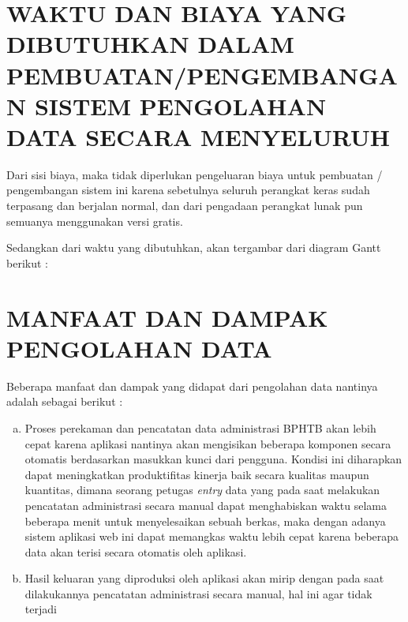 \documentclass[pdftex,12pt, oneside]{article}
\begin{document}
\section{WAKTU DAN BIAYA YANG DIBUTUHKAN DALAM PEMBUATAN/PENGEMBANGAN SISTEM PENGOLAHAN DATA SECARA MENYELURUH}

Dari sisi biaya, maka tidak diperlukan pengeluaran biaya untuk pembuatan / pengembangan sistem ini karena sebetulnya seluruh perangkat keras sudah terpasang dan berjalan normal, dan dari pengadaan perangkat lunak pun semuanya menggunakan versi gratis.

Sedangkan dari waktu yang dibutuhkan, akan tergambar dari diagram Gantt berikut :



\section{MANFAAT DAN DAMPAK PENGOLAHAN DATA}

Beberapa manfaat dan dampak yang didapat dari pengolahan data nantinya adalah sebagai berikut :

\begin{enumerate}[a.]
  \item Proses perekaman dan pencatatan data administrasi BPHTB akan lebih cepat karena aplikasi nantinya akan mengisikan beberapa komponen secara otomatis berdasarkan masukkan kunci dari pengguna. Kondisi ini diharapkan dapat meningkatkan produktifitas kinerja baik secara kualitas maupun kuantitas, dimana seorang petugas \textit{entry} data yang pada saat melakukan pencatatan administrasi secara manual dapat menghabiskan waktu selama beberapa menit untuk menyelesaikan sebuah berkas, maka dengan adanya sistem aplikasi web ini dapat memangkas waktu lebih cepat karena beberapa data akan terisi secara otomatis oleh aplikasi.
  
  \item Hasil keluaran yang diproduksi oleh aplikasi akan mirip dengan pada saat dilakukannya pencatatan administrasi secara manual, hal ini agar tidak terjadi 
\end{enumerate}
\end{document}
